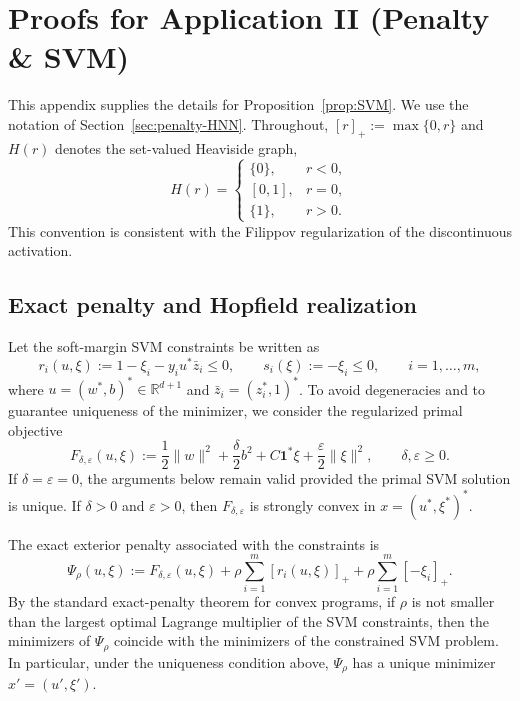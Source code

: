 \documentclass[journal]{IEEEtran}
\theoremstyle{myplain}
\begin{document}
\section{Proofs for Application II (Penalty \& SVM)}\label{app:penalty-proofs}

This appendix supplies the details for Proposition~\ref{prop:SVM}. We use the
notation of Section~\ref{sec:penalty-HNN}. Throughout, \([r]_+:=\max\{0,r\}\)
and \(H(r)\) denotes the set-valued Heaviside graph,
\[
  H(r)=
  \begin{cases}
    \{0\}, & r<0,\\
    [0,1], & r=0,\\
    \{1\}, & r>0.
  \end{cases}
\]
This convention is consistent with the Filippov regularization of the
discontinuous activation.

\subsection{Exact penalty and Hopfield realization}

Let the soft-margin SVM constraints be written as
\[
  r_i(u,\xi):=1-\xi_i-y_i u^* \bar z_i\le 0,
  \qquad
  s_i(\xi):=-\xi_i\le 0,
  \qquad i=1,\dots,m,
\]
where \(u=(w^*,b)^*\in\mathbb{R}^{d+1}\) and
\(\bar z_i=(z_i^*,1)^*\). To avoid degeneracies and to guarantee uniqueness
of the minimizer, we consider the regularized primal objective
\begin{equation}\label{eq:app-svm-primal-regularized}
  F_{\delta,\varepsilon}(u,\xi)
  :=
  \frac12\|w\|^2+\frac{\delta}{2}b^2
  +C\mathbf 1^*\xi+\frac{\varepsilon}{2}\|\xi\|^2,
  \qquad \delta,\varepsilon\ge 0.
\end{equation}
If \(\delta=\varepsilon=0\), the arguments below remain valid provided the
primal SVM solution is unique. If \(\delta>0\) and \(\varepsilon>0\), then
\(F_{\delta,\varepsilon}\) is strongly convex in \(x=(u^*,\xi^*)^*\).

The exact exterior penalty associated with the constraints is
\begin{equation}\label{eq:app-svm-exact-penalty}
  \Psi_\rho(u,\xi)
  :=
  F_{\delta,\varepsilon}(u,\xi)
  +\rho\sum_{i=1}^m [r_i(u,\xi)]_+
  +\rho\sum_{i=1}^m [-\xi_i]_+ .
\end{equation}
By the standard exact-penalty theorem for convex programs, if \(\rho\) is not
smaller than the largest optimal Lagrange multiplier of the SVM constraints,
then the minimizers of \(\Psi_\rho\) coincide with the minimizers of the
constrained SVM problem. In particular, under the uniqueness condition above,
\(\Psi_\rho\) has a unique minimizer \(x'=(u',\xi')\).
\end{document}
